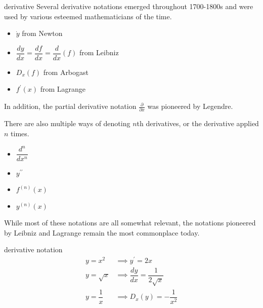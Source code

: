 \begin{notation}{derivative}
    Several derivative notations emerged throughout 1700-1800s and were used by various esteemed mathematicians of the time.
    
    \begin{multicols}{2}
    \begin{itemize}
        \item \( \dot y \) from Newton
        \item \( \dfrac{dy}{dx} = \dfrac{df}{dx} = \dfrac{d}{dx} \left( f \right) \) from Leibniz
        \item \( D_x \left( f \right) \) from Arbogast
        \item \( f^\prime \left( x \right) \) from Lagrange
    \end{itemize}
    \end{multicols}
    
    In addition, the partial derivative notation \( \frac{\partial}{\partial x} \) was pioneered by Legendre.
    
    There are also multiple ways of denoting \( n \)th derivatives, or the derivative applied \( n \) times.
    
    \begin{multicols}{2}
    \begin{itemize}
        \item \( \dfrac{d^n}{dx^n} \)
        \item \( y^{\prime \prime} \)
        \item \( f^{(n)} \left( x \right) \)
        \item \( y^{(n)} \left( x \right) \)
    \end{itemize}
    \end{multicols}
    
    While most of these notations are all somewhat relevant, the notations pioneered by Leibniz and Lagrange remain the most commonplace today.
\end{notation}

\begin{example}{derivative notation}
    \begin{align}
        y = x^2 &\implies y^\prime = 2x \\
        y = \sqrt{x} &\implies \dfrac{dy}{dx} = \dfrac{1}{2\sqrt{x}} \\
        y = \dfrac{1}{x} &\implies D_x \left( y \right) = -\dfrac{1}{x^2}
    \end{align}
\end{example}

